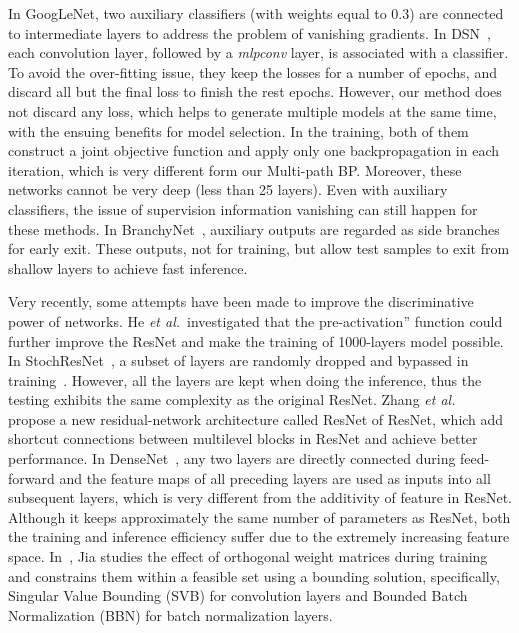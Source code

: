\documentclass[10pt,onecolumn,letterpaper]{article}
\def\etal{{\em et al.\/}\, }
\def\etal{{\em et al.\/}\, }
\begin{document}
In GoogLeNet, two auxiliary classifiers (with weights equal to 0.3) are connected to intermediate layers to address the problem of vanishing gradients. In DSN~\cite{Lee2015}, each convolution layer, followed by a \emph{mlpconv} layer, is associated with a classifier. To avoid the over-fitting issue, they keep the losses for a number of epochs, and discard all but the final loss to finish the rest epochs. However, our method does not discard any loss, which helps to generate multiple models at the same time, with the ensuing benefits for model selection. In the training, both of them construct a joint objective function and apply only one backpropagation in each iteration, which is very different form our Multi-path BP. Moreover, these networks cannot be very deep (less than 25 layers). Even with auxiliary classifiers, the issue of supervision information vanishing can still happen for these methods.
In BranchyNet~\cite{teerapittayanon2016branchynet}, auxiliary outputs are regarded as side branches for early exit. These outputs, not for training, but allow test samples to exit from shallow layers to achieve fast inference.

Very recently, some attempts have been made to improve the discriminative power of networks.
He \etal investigated that the pre-activation” function could further improve the ResNet and make the training of 1000-layers model possible. In StochResNet~\cite{DBLP:journals/corr/HuangSLSW16}, a subset of layers are randomly dropped and bypassed in training~\cite{DBLP:journals/corr/HuangSLSW16}. However, all the layers are kept when doing the inference, thus the testing exhibits the same complexity as the original ResNet.
Zhang \etal~\cite{zhang2016residual} propose a new residual-network architecture called ResNet of ResNet, which add shortcut connections between multilevel blocks in ResNet and achieve better performance. In DenseNet~\cite{huang2016densely}, any two layers are directly connected during feed-forward and the feature maps of all preceding layers are used as inputs into all subsequent layers, which is very different from the additivity of feature in ResNet.
Although it keeps approximately the same number of parameters as ResNet, both the training and inference efficiency suffer due to the extremely increasing feature space.  In~\cite{jia2016improving}, Jia studies the effect of orthogonal weight matrices during training and constrains them within a feasible set using a bounding solution, specifically, Singular Value Bounding (SVB) for convolution layers and Bounded Batch Normalization (BBN) for batch normalization layers.
\end{document}
